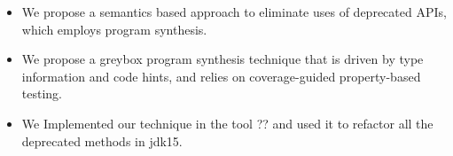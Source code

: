 \documentclass[runningheads,a4paper]{llncs}
\begin{document}
\begin{itemize}

\item We propose a semantics based approach to eliminate uses of deprecated APIs, which employs program synthesis.

\item We propose a greybox program synthesis technique that is driven by type information and code hints, and relies on coverage-guided property-based testing.
  
  
  


\item We Implemented our technique in the tool ?? and used it to refactor all the deprecated methods in jdk15.
  
\end{itemize}  

%
\end{document}
